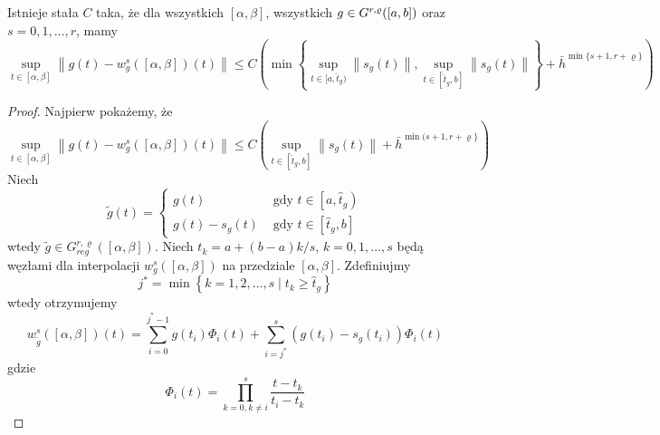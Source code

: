 \documentclass[oik, pdftex, robocza, man]{mgrwms}
\begin{document}
    \begin{lemma} \label{lem:1}
        Istnieje stała $C$ taka, że dla wszystkich $[\alpha, \beta]$, wszystkich $g \in G^{r,\varrho}([a,b])$ oraz $s=0,1,\dots,r$, mamy
        \begin{equation*}
            \sup _{t \in[\alpha, \beta]}\left\|g(t)-w_{g}^{s}([\alpha, \beta])(t)\right\| \leq C\left(\min \left\{\sup_{t \in[a, \hat{t}_{g})}\left\|s_{g}(t)\right\|, \sup _{t \in [\hat{t}_{g}, b]}\left\|s_{g}(t)\right\|\right\}+\bar{h}^{\min \{s+1, r+\varrho\}}\right)
        \end{equation*}
    \end{lemma}
    \begin{proof}
        Najpierw pokażemy, że
        \begin{equation} \label{eq:7}
            \sup _{t \in[\alpha, \beta]}\left\|g(t)-w_{g}^{s}([\alpha, \beta])(t)\right\| \leq C\left(\sup _{t \in\left[\hat{t}_{g}, b\right]}\left\|s_{g}(t)\right\|+\bar{h}^{\min (s+1, r+\varrho\}}\right)
        \end{equation}
        Niech
        \begin{equation} \label{eq:8}
            \tilde{g}(t)= \begin{cases}
                g(t)            & \text { gdy } t \in\left[a, \hat{t}_{g}\right) \\ 
                g(t)-s_{g}(t)   & \text { gdy } t \in\left[\hat{t}_{g}, b\right]\end{cases}
        \end{equation}
        wtedy $\tilde{g} \in G_{reg}^{r, \varrho}([\alpha, \beta])$. Niech $t_{k}=a+(b-a) k / s$, $k=0,1, \ldots, s$ będą węzłami dla interpolacji $w_{g}^{s}([\alpha, \beta])$ na przedziale $[\alpha, \beta]$. Zdefiniujmy
        \begin{equation} \label{eq:9}
            j^{*}=\min \left\{k=1,2, \ldots, s \mid t_{k} \geq \hat{t}_{g}\right\}            
        \end{equation}
        wtedy otrzymujemy
        \begin{equation} \label{eq:10}
            w_{\tilde{g}}^{s}([\alpha, \beta])(t)=\sum_{i=0}^{j^{*}-1} g\left(t_{i}\right) \Phi_{i}(t)+\sum_{i=j^{*}}^{s}\left(g\left(t_{i}\right)-s_{g}\left(t_{i}\right)\right) \Phi_{i}(t)            
        \end{equation}
        gdzie
        \begin{equation*}
            \Phi_{i}(t)=\prod_{k=0, k \neq i}^{s} \frac{t-t_{k}}{t_{i}-t_{k}}
        \end{equation*}

\end{proof}
\end{document}
